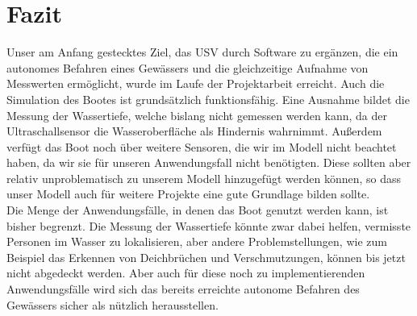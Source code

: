 \documentclass[11pt]{article}
\begin{document}
\section{Fazit} \label{fazit}
Unser am Anfang gestecktes Ziel, das USV durch Software zu ergänzen, die ein autonomes Befahren eines Gewässers und die gleichzeitige Aufnahme von Messwerten ermöglicht, wurde im Laufe der Projektarbeit erreicht. Auch die Simulation des Bootes ist grundsätzlich funktionsfähig. Eine Ausnahme bildet die Messung der Wassertiefe, welche bislang nicht gemessen werden kann, da der Ultraschallsensor die Wasseroberfläche als Hindernis wahrnimmt. Außerdem verfügt das Boot noch über weitere Sensoren, die wir im Modell nicht beachtet haben, da wir sie für unseren Anwendungsfall nicht benötigten. Diese sollten aber relativ unproblematisch zu unserem Modell hinzugefügt werden können, so dass unser Modell auch für weitere Projekte eine gute Grundlage bilden sollte.\\
Die Menge der Anwendungsfälle, in denen das Boot genutzt werden kann, ist bisher begrenzt. Die Messung der Wassertiefe könnte zwar dabei helfen, vermisste Personen im Wasser zu lokalisieren, aber andere Problemstellungen, wie zum Beispiel das Erkennen von Deichbrüchen und Verschmutzungen, können bis jetzt nicht abgedeckt werden. Aber auch für diese noch zu implementierenden Anwendungsfälle wird sich das bereits erreichte autonome Befahren des Gewässers sicher als nützlich herausstellen.

{}

\end{document}

